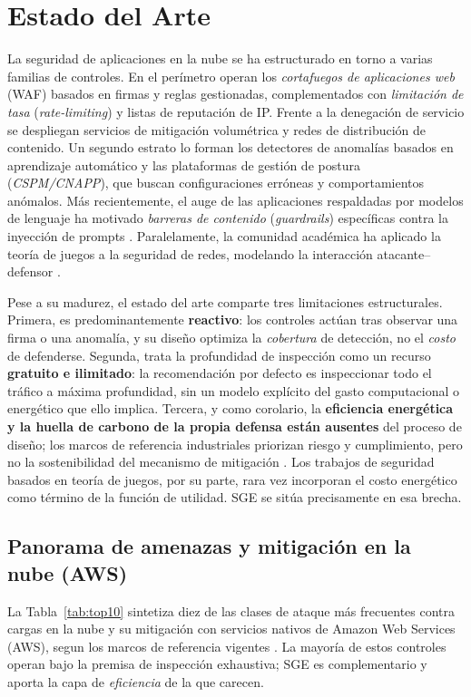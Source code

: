 \documentclass[10pt,twocolumn]{article}
\begin{document}
\section{Estado del Arte}
\label{sec:sota}
La seguridad de aplicaciones en la nube se ha estructurado en torno a varias familias
de controles. En el per\'imetro operan los \emph{cortafuegos de aplicaciones web} (WAF)
basados en firmas y reglas gestionadas, complementados con \emph{limitaci\'on de tasa}
(\emph{rate-limiting}) y listas de reputaci\'on de IP. Frente a la denegaci\'on de
servicio se despliegan servicios de mitigaci\'on volum\'etrica y redes de distribuci\'on
de contenido. Un segundo estrato lo forman los detectores de anomal\'ias basados en
aprendizaje autom\'atico y las plataformas de gesti\'on de postura (\emph{CSPM/CNAPP}),
que buscan configuraciones err\'oneas y comportamientos an\'omalos. M\'as recientemente,
el auge de las aplicaciones respaldadas por modelos de lenguaje ha motivado
\emph{barreras de contenido} (\emph{guardrails}) espec\'ificas contra la inyecci\'on de
prompts \cite{owaspllm,owaspapi}. Paralelamente, la comunidad acad\'emica ha aplicado la
teor\'ia de juegos a la seguridad de redes, modelando la interacci\'on atacante--defensor
\cite{alpcan,manshaei}.

Pese a su madurez, el estado del arte comparte tres limitaciones estructurales. Primera,
es predominantemente \textbf{reactivo}: los controles act\'uan tras observar una firma o
una anomal\'ia, y su dise\~no optimiza la \emph{cobertura} de detecci\'on, no el
\emph{costo} de defenderse. Segunda, trata la profundidad de inspecci\'on como un
recurso \textbf{gratuito e ilimitado}: la recomendaci\'on por defecto es inspeccionar
todo el tr\'afico a m\'axima profundidad, sin un modelo expl\'icito del gasto
computacional o energ\'etico que ello implica. Tercera, y como corolario, la
\textbf{eficiencia energ\'etica y la huella de carbono de la propia defensa est\'an
ausentes} del proceso de dise\~no; los marcos de referencia industriales priorizan
riesgo y cumplimiento, pero no la sostenibilidad del mecanismo de mitigaci\'on
\cite{csa,awswaf}. Los trabajos de seguridad basados en teor\'ia de juegos, por su
parte, rara vez incorporan el costo energ\'etico como t\'ermino de la funci\'on de
utilidad. SGE se sit\'ua precisamente en esa brecha.

\subsection{Panorama de amenazas y mitigaci\'on en la nube (AWS)}
\label{sec:top10}
La Tabla~\ref{tab:top10} sintetiza diez de las clases de ataque m\'as frecuentes contra
cargas en la nube y su mitigaci\'on con servicios nativos de Amazon Web Services (AWS),
segun los marcos de referencia vigentes \cite{csa,owaspapi,owaspllm,awswaf}. La mayor\'ia
de estos controles operan bajo la premisa de inspecci\'on exhaustiva; SGE es
complementario y aporta la capa de \emph{eficiencia} de la que carecen.
\end{document}
